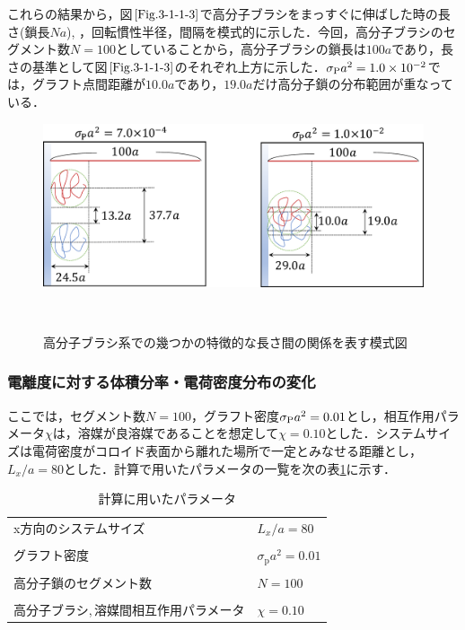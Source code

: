 \documentclass[10.5pt,a4j]{jarticle}
\begin{document}
これらの結果から，図$\ref{Fig.3-1-1-3}$で高分子ブラシをまっすぐに伸ばした時の長さ(鎖長$Na$),
，回転慣性半径，間隔を模式的に示した．今回，高分子ブラシのセグメント数$N=100$としていることから，高分子ブラシの鎖長は$100a$であり，長さの基準として図$\ref{Fig.3-1-1-3}$のそれぞれ上方に示した．$\sigma_{\rm{P}}a^2=1.0\times10^{-2}$では，グラフト点間距離が$10.0a$であり，$19.0a$だけ高分子鎖の分布範囲が重なっている．
\begin{figure}[H]
		\centering
            \includegraphics[keepaspectratio,scale=0.4]{Fig/FIg.8/graft_Rg.pdf}
            \caption{高分子ブラシ系での幾つかの特徴的な長さ間の関係を表す模式図}
\            \label{Fig.3-1-1-3}
\end{figure}

\subsubsection{電離度に対する体積分率・電荷密度分布の変化}
ここでは，セグメント数$N=100$，グラフト密度$\sigma_{\rm{P}}a^2=0.01$とし，相互作用パラメータ$\chi$は，溶媒が良溶媒であることを想定して$\chi=0.10$とした．システムサイズは電荷密度がコロイド表面から離れた場所で一定とみなせる距離とし，$L_x/a=80$とした．計算で用いたパラメータの一覧を次の表\ref{table2-7-2}に示す．
\begin{table}[htb]
    \caption{計算に用いたパラメータ}
    \vspace{-1.50 zh}
    \begin{center}
        \begin{tabular}{ll}\hline
            x方向のシステムサイズ & $L_x/a = 80 $\\ \\
            グラフト密度 & $\sigma_{\mathrm p}a^{2} = 0.01$\\ \\
            高分子鎖のセグメント数 & $N = 100$\\ \\
            高分子ブラシ,\,溶媒間相互作用パラメータ & $\chi = 0.10$\\ \hline
        \end{tabular}
    \end{center}
        \label{table2-7-2}
\end{table}\\
\end{document}
